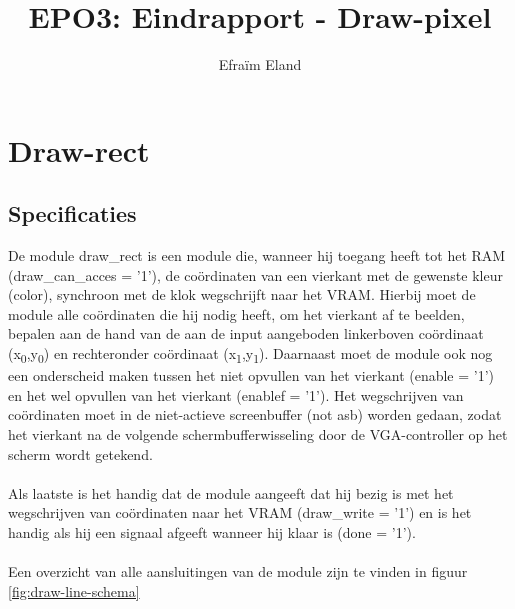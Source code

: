 \documentclass{scrartcl} %
\author{Efraïm Eland}%
\title{EPO3: Eindrapport - Draw-pixel}
\begin{document}
\section{Draw-rect} %
\label{sec:draw-rect}  %

\newcommand{\tss}{\textsubscript}

\subsection{Specificaties}
De module draw\_rect is een module die, wanneer hij toegang heeft tot het RAM (draw\_can\_acces = '1'), de coördinaten van een vierkant met de gewenste kleur (color), synchroon met de klok wegschrijft naar het VRAM. Hierbij moet de module alle coördinaten die hij nodig heeft, om het vierkant af te beelden, bepalen aan de hand van de aan de input aangeboden linkerboven coördinaat (x\tss{0},y\tss{0}) en rechteronder coördinaat (x\tss{1},y\tss{1}). Daarnaast moet de module ook nog een onderscheid maken tussen het niet opvullen van het vierkant (enable = '1') en het wel opvullen van het vierkant (enablef = '1'). Het wegschrijven van coördinaten moet in de niet-actieve screenbuffer (not asb) worden gedaan, zodat het vierkant na de volgende schermbufferwisseling door de VGA-controller op het scherm wordt getekend.
\\\\
Als laatste is het handig dat de module aangeeft dat hij bezig is met het wegschrijven van coördinaten naar het VRAM (draw\_write = '1') en is het handig als hij een signaal afgeeft wanneer hij klaar is (done = '1').
\\\\
Een overzicht van alle aansluitingen van de module zijn te vinden in figuur \ref{fig:draw-line-schema}

\end{document}
